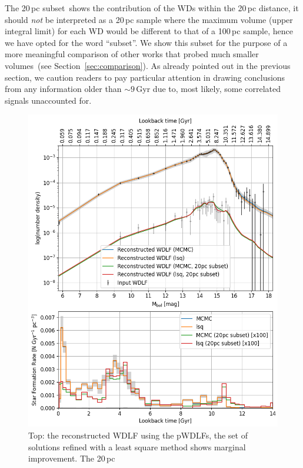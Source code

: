 \documentclass[fleqn,usenatbib]{mnras}
\begin{document}
The 20\,pc subset\ shows the contribution of the
WDs within the 20\,pc distance, it should \textit{not} be interpreted as a
20\,pc sample where the maximum volume (upper integral limit) for each WD would
be different to that of a 100\,pc sample, hence we have opted for the word
``subset''. We show this subset for the purpose of a more meaningful comparison
of other works that probed much smaller volumes~(see 
Section~\ref{sec:comparison}). As already pointed out in the previous section,
we caution readers to pay particular attention in drawing conclusions from any 
information older than $\sim$$9$\,Gyr due to, most likely, some correlated
signals unaccounted for.

\begin{figure}
    \includegraphics[width=
    \columnwidth]{figures/fig_05_gcns_reconstructed_wdlf_optimal_resolution_bin_optimal.png}
    \caption{Top: the reconstructed WDLF using the pWDLFs, the set of solutions
    refined with a least square method shows marginal improvement. The 20\,pc
}
\end{figure}
\end{document}
